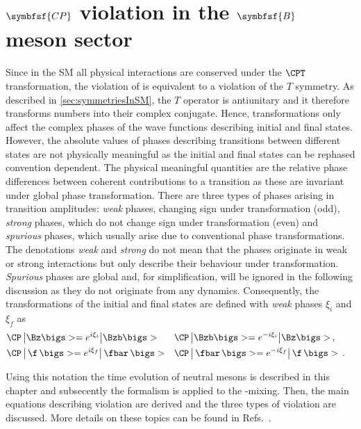 \chapter[head={\CP violation in the $B$ meson sector},tocentry={$\symbfsf{C{}P}$ violation in the $\symbfsf{B}$ meson sector}]
{$\symbfsf{C{}P}$ violation in the $\symbfsf{B}$ meson sector}
\label{chap:CPV}

\linespread{1.08}\selectfont
Since in the \ac{SM} all physical interactions are conserved under the $\CPT$ transformation, the violation of \CP is equivalent to a violation of the $T$ symmetry.
As described in \cref{sec:symmetriesInSM}, the $T$ operator is antiunitary and it therefore transforms numbers into their complex conjugate.
Hence, \CP transformations only affect the complex phases of the wave functions describing initial and final states.
However, the absolute values of phases describing transitions between different states are not physically meaningful as the initial and final states can be rephased convention dependent.
The physical meaningful quantities are the relative phase differences between coherent contributions to a transition as these are invariant under global phase transformation.
There are three types of phases arising in transition amplitudes:
\emph{weak} phases, changing sign under \CP transformation (\CP odd), \emph{strong} phases, which do not change sign under \CP transformation (\CP even) and \emph{spurious} phases, which usually arise due to conventional phase transformations.
The denotations \emph{weak} and \emph{strong} do not mean that the phases originate in weak or strong interactions but only describe their behaviour under \CP transformation.
\emph{Spurious} phases are global and, for simplification, will be ignored in the following discussion as they do not originate from any dynamics.
Consequently, the \mbox{\CP transformations} of the initial and final states are defined with \emph{weak} phases $\xi_i$ and $\xi_f$ as
\begin{equation}
\begin{aligned}
&\CP\,\big|\Bz\bigs> =e^{i\xi_i}\big|\Bzb\bigs>&&\CP\,\big|\Bzb\bigs>=e^{-i\xi_i}\big|\Bz\bigs>\,,&\\
&\CP\,\big|\,\f\,\bigs> =e^{i\xi_f}\big|\,\fbar\,\bigs>&&\CP\,\big|\,\fbar\,\bigs>=e^{-i\xi_f}\big|\,\f\,\bigs>\,.& \label{eq:CPTransInitFinal}
\end{aligned}
\end{equation}

Using this notation the time evolution of neutral mesons is described in this chapter and subsecently the formalism is applied to the \Bz-\Bzb mixing.
Then, the main equations describing \CP violation are derived and the three types of \mbox{\CP violation} are discussed.
More details on these topics can be found in Refs.~\cite{Branco:396964,Bigi:1295518}.

